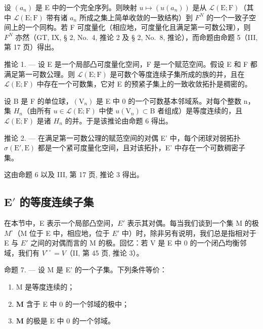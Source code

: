 设 \((a_{n})\) 是 E 中的一个完全序列。则映射 \(u \mapsto (u(a_{n}))\) 是从 \(\mathcal{L}(\mathrm{E};\mathrm{F})\)（其中 \(\mathcal{L}(\mathrm{E};\mathrm{F})\) 带有诸 \(a_{n}\) 所成之集上简单收敛的一致结构）到 \(F^{N}\) 的一个一致子空间上的一个同构。若 F 可度量化（相应地，可度量化且满足第一可数公理），则 \(F^{N}\) 亦然（GT, IX, § 2, No.~4, 推论 2 及 § 2, No.~8, 推论），而命题由命题 5（III, 第 17 页）得出。

推论 1. --- 设 E 是一个局部凸可度量化空间，F 是一个赋范空间。假设 E 和 F 都满足第一可数公理。则 \(\mathcal{L}(\mathrm{E};\mathrm{F})\) 是可数个等度连续子集所成的族的并，且在 \(\mathcal{L}(\mathrm{E};\mathrm{F})\) 中存在一个可数集，它对 E 的预紧子集上的一致收敛拓扑是稠密的。

设 B 是 F 的单位球，\((\mathrm{V}_{n})\) 是 E 中 0 的一个可数基本邻域系。对每个整数 n，集 \(H_{n}\)（由所有 \(u \in \mathcal{L}(\mathrm{E}; \mathrm{F})\) 中使 \(u(\mathrm{V}_{n}) \subset \mathrm{B}\) 者组成）是等度连续的，且 \(\mathcal{L}(\mathrm{E}; \mathrm{F})\) 是诸 \(H_{n}\) 的并。于是该推论由命题 6 得出。

推论 2. --- 在满足第一可数公理的赋范空间的对偶 E' 中，每个闭球对弱拓扑 \(\sigma(\mathrm{E}',\mathrm{E})\) 都是一个紧可度量化空间，且对该拓扑，E' 中存在一个可数稠密子集。

这由命题 6 以及 III, 第 17 页, 推论 3 得出。

\subsection{\texorpdfstring{\(\mathbf{E}'\) 的等度连续子集}{\textbackslash mathbf\{E\}\textquotesingle{} 的等度连续子集}}

在本节中，E 表示一个局部凸空间，\(E'\) 表示其对偶。每当我们谈到一个集 M 的极 \(M^{\circ}\)（M 位于 E 中，相应地，位于 \(E'\) 中）时，除非另有说明，我们总是指相对于 E 与 \(E'\) 之间的对偶而言的 M 的极。回忆：若 V 是 E 中 0 的一个闭凸均衡邻域，我们有 \(V^{\circ\circ}=V\)（II, 第 45 页, 推论 3）。

命题 7. --- 设 M 是 E' 的一个子集。下列条件等价：

\begin{enumerate}
\def\labelenumi{(\roman{enumi})}
\item
  M 是等度连续的；
\item
  \(\mathbf{M}\) 含于 E 中 0 的一个邻域的极中；
\item
  \(\mathbf{M}\) 的极是 E 中 0 的一个邻域。
\end{enumerate}

